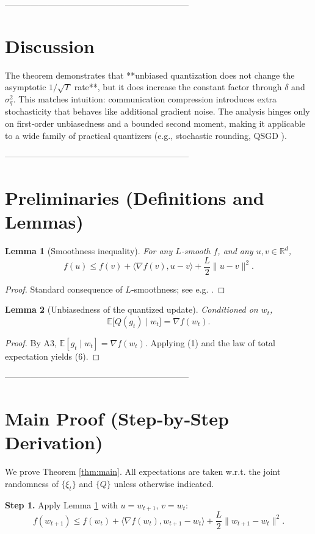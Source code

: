 \documentclass{article}
\newtheorem{lemma}{Lemma}
\newcommand{\E}{\mathbb{E}}
\newcommand{\R}{\mathbb{R}}
\begin{document}
-----------------------------------------------------------------
\section*{Discussion}
The theorem demonstrates that **unbiased quantization does not change the asymptotic $1/\sqrt{T}$ rate**, but it does increase the constant factor through $\delta$ and $\sigma_{q}^{2}$. This matches intuition: communication compression introduces extra stochasticity that behaves like additional gradient noise. The analysis hinges only on first‑order unbiasedness and a bounded second moment, making it applicable to a wide family of practical quantizers (e.g., stochastic rounding, QSGD \cite{Alistarh2017}).

-----------------------------------------------------------------
\section*{Preliminaries (Definitions and Lemmas)}
\begin{lemma}[Smoothness inequality]\label{lem:smooth}
For any $L$‑smooth $f$, and any $u,v\in\R^{d}$,
\[
f(u)\le f(v)+\langle\nabla f(v),u-v\rangle+\frac{L}{2}\|u-v\|^{2}. \tag{5}
\]
\end{lemma}
\begin{proof}
Standard consequence of $L$‑smoothness; see e.g. \cite{Nesterov2004}. \qedhere
\end{proof}

\begin{lemma}[Unbiasedness of the quantized update]\label{lem:unbiased}
Conditioned on $w_{t}$,
\[
\E\!\big[Q(g_{t})\mid w_{t}\big]=\nabla f(w_{t}). \tag{6}
\]
\end{lemma}
\begin{proof}
By A3, $\E[g_{t}\mid w_{t}]=\nabla f(w_{t})$. Applying (1) and the law of total expectation yields (6). \qedhere
\end{proof}

-----------------------------------------------------------------
\section*{Main Proof (Step‑by‑Step Derivation)}
We prove Theorem \ref{thm:main}. All expectations are taken w.r.t. the joint randomness of $\{\xi_{t}\}$ and $\{Q\}$ unless otherwise indicated.

\noindent\textbf{Step 1.} Apply Lemma \ref{lem:smooth} with $u=w_{t+1}$, $v=w_{t}$:
\[
f(w_{t+1})\le f(w_{t})+\langle\nabla f(w_{t}),w_{t+1}-w_{t}\rangle+\frac{L}{2}\|w_{t+1}-w_{t}\|^{2}. \tag{7}
\]
\end{document}
